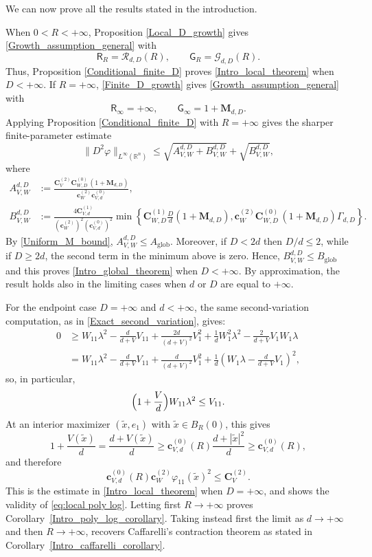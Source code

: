 \documentclass[11pt,a4paper,reqno]{amsart}
\numberwithin{equation}{section}
\theoremstyle{definition}
\renewcommand{\tilde}{\widetilde}
\newcommand{\<}{\ensuremath \leq}
\renewcommand{\>}{\ensuremath \geq}
\renewcommand{\tilde}{\widetilde}
\newcommand{\CV}{\mathbf{C}_V}
\newcommand{\cW}{\mathbf{c}_W}
\newcommand{\CVp}[1]{\mathbf{C}_{V,#1}}
\newcommand{\CWp}[1]{\mathbf{C}_{W,#1}}
\newcommand{\cVp}[1]{\mathbf{c}_{V,#1}}
\begin{document}
We can now prove all the results stated in the introduction.

When $0<R<+\infty$, Proposition \ref{Local_D_growth} gives \cref{Growth_assumption_general} with
\[
    \mathsf R_R=\mathcal R_{d,D}(R),
    \qquad
    \mathsf G_R=\mathcal G_{d,D}(R).
\]
Thus, Proposition \ref{Conditional_finite_D} proves \cref{Intro_local_theorem} when $D<+\infty$. If $R=+\infty$, \cref{Finite_D_growth} gives \cref{Growth_assumption_general} with
\[
    \mathsf R_\infty=+\infty,
    \qquad
    \mathsf G_\infty=1+\mathbf{M}_{d,D}.
\]
Applying Proposition \ref{Conditional_finite_D} with $R=+\infty$ gives the sharper finite-parameter estimate
\[
    \|D^2\varphi\|_{L^\infty(\mathbb{R}^n)}
    \le
    \sqrt{A_{V,W}^{d,D}+B_{V,W}^{d,D}}+\sqrt{B_{V,W}^{d,D}},
\]
where
\[
\begin{aligned}
A_{V,W}^{d,D}
&:=
\frac{\CV^{(2)}\CWp{D}^{(0)}\, (1+\mathbf M_{d,D})}
{\cW^{(2)}\cVp{d}^{(0)}},\\
B_{V,W}^{d,D}
&:=
\frac{4\CVp{d}^{(1)}}{(\cW^{(2)})^2(\cVp{d}^{(0)})^2}
\min\left\{
\CWp{D}^{(1)}\frac{D}{d}(1+\mathbf M_{d,D}),
\cW^{(2)}\CWp{D}^{(0)}\, (1+\mathbf M_{d,D})\Gamma_{d,D}
\right\}.
\end{aligned}
\]
By \cref{Uniform_M_bound}, $A_{V,W}^{d,D}\le A_{\mathrm{glob}}$. Moreover, if $D<2d$ then $D/d\le2$, while if $D\ge2d$, the second term in the minimum above is zero. Hence, $B_{V,W}^{d,D}\le B_{\mathrm{glob}}$ and this proves \cref{Intro_global_theorem} when $D<+\infty$. By approximation, the result holds also in the limiting cases when $d$ or $D$ are equal to $+\infty$.

\medskip



For the endpoint case $D=+\infty$ and $d<+\infty$, the same second-variation computation, as in \cref{Exact_second_variation}, gives:
\[
\begin{aligned}
0&\ge W_{11}\lambda^2-\frac{d}{d+V}V_{11}
+\frac{2d}{(d+V)^2}V_1^2 +\frac{1}{d}W_1^2\lambda^2
-\frac{2}{d+V}V_1W_1\lambda\\
&=W_{11}\lambda^2-\frac{d}{d+V}V_{11}
+\frac{d}{(d+V)^2}V_1^2+\frac{1}{d}\left(W_1\lambda-\frac{d}{d+V}V_1\right)^2,
\end{aligned}
\]
so, in particular,
\begin{equation}\label{Endpoint_second_variation}
    \Bigl(1+\frac{V}{d}\Bigr)W_{11}\lambda^2\le V_{11}.
\end{equation}
At an interior maximizer $(\tilde x,e_1)$ with $\tilde x\in B_R(0)$, this gives
\[
    1+\frac{V(\tilde x)}{d}
    =
    \frac{d+V(\tilde x)}{d}
    \ge
    \cVp{d}^{(0)}(R)\frac{d+|\tilde x|^2}{d}
    \ge
    \cVp{d}^{(0)}(R),
\]
and therefore
\[
    \cVp{d}^{(0)}(R)\cW^{(2)}\varphi_{11}(\tilde x)^2
    \le
    \CV^{(2)}.
\]
This is the estimate in \cref{Intro_local_theorem} when $D=+\infty$,
and shows the validity of
\eqref{eq:local poly log}.
Letting first $R\to+\infty$ proves Corollary~\ref{Intro_poly_log_corollary}.
Taking instead first the limit as $d\to +\infty$ and then $R \to +\infty$, recovers Caffarelli's contraction theorem as stated in Corollary~\ref{Intro_caffarelli_corollary}.
\end{document}
